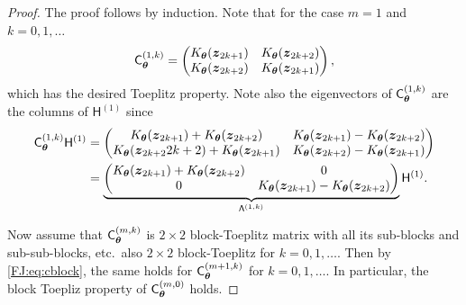 \documentclass[graybox,footinfo]{svmult}
\begin{document}
\begin{proof}
    The proof follows by induction.  Note that for the case $m=1$ and $k = 0, 1, \ldots$
    \begin{equation*}
        \mathsf{C}_{{\boldsymbol{\theta}}}^{(1,k)} 
        =  \begin{pmatrix}
        K_{\boldsymbol{\theta}}({\boldsymbol{z}}_{2k+1}) & K_{\boldsymbol{\theta}}({\boldsymbol{z}}_{2k+2}) \\
        K_{\boldsymbol{\theta}}({\boldsymbol{z}}_{2k+2}) & K_{\boldsymbol{\theta}}({\boldsymbol{z}}_{2k+1}) 
        \end{pmatrix} ,
    \end{equation*}
   which has the desired Toeplitz property. Note also the eigenvectors of $\mathsf{C}_{{\boldsymbol{\theta}}}^{(1,k)}$ are the columns of $\mathsf{H}^{(1)}$ since   
   \begin{align*}
        \mathsf{C}_{{\boldsymbol{\theta}}}^{(1,k)} \mathsf{H}^{(1)} & =  \begin{pmatrix}
        K_{\boldsymbol{\theta}}({\boldsymbol{z}}_{2k+1}) + K_{\boldsymbol{\theta}}({\boldsymbol{z}}_{2k+2}) & K_{\boldsymbol{\theta}}({\boldsymbol{z}}_{2k+1}) - K_{\boldsymbol{\theta}}({\boldsymbol{z}}_{2k+2})\\
        K_{\boldsymbol{\theta}}({\boldsymbol{z}}_{2k+2}{2k+2}) + K_{\boldsymbol{\theta}}({\boldsymbol{z}}_{2k+1}) &  K_{\boldsymbol{\theta}}({\boldsymbol{z}}_{2k+2}) - K_{\boldsymbol{\theta}}({\boldsymbol{z}}_{2k+1}) 
        \end{pmatrix} \\
        & = \underbrace{\begin{pmatrix}
        K_{\boldsymbol{\theta}}({\boldsymbol{z}}_{2k+1}) + K_{\boldsymbol{\theta}}({\boldsymbol{z}}_{2k+2}) & 0\\
        0 &   K_{\boldsymbol{\theta}}({\boldsymbol{z}}_{2k+1}) - K_{\boldsymbol{\theta}}({\boldsymbol{z}}_{2k+2})
        \end{pmatrix}}_{\mathsf{\Lambda}^{(1,k)}} \mathsf{H}^{(1)}.
    \end{align*}

   Now assume that $\mathsf{C}_{{\boldsymbol{\theta}}}^{(m,k)}$ is $2\times 2$ block-Toeplitz matrix with all its sub-blocks and sub-sub-blocks, etc.\ also $2\times 2$ block-Toeplitz for $k = 0, 1, \ldots$.  Then by \eqref{FJ:eq:cblock}, the same holds for $\mathsf{C}_{{\boldsymbol{\theta}}}^{(m+1,k)}$ for $k = 0, 1, \ldots$.  In particular, the block Toepliz property of $\mathsf{C}_{{\boldsymbol{\theta}}}^{(m,0)}$ holds.
   

\end{proof}
\end{document}
